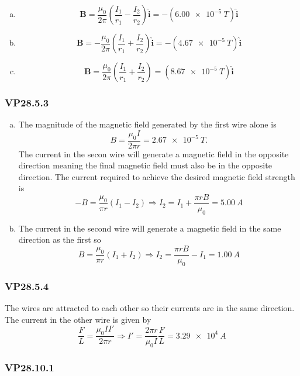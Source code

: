 \documentclass{article}
\begin{document}
\begin{enumerate}[(a)]
  \item \[\mathbf{B} = \frac{\mu_0}{2 \pi} \left( \frac{I_1}{r_1} - \frac{I_2}{r_2} \right) \hat{\mathbf{i}} = -(\qty{6.00e-5}{T}) \hat{\mathbf{i}}\]

  \item \[\mathbf{B} = -\frac{\mu_0}{2 \pi} \left( \frac{I_1}{r_1} + \frac{I_2}{r_2} \right) \hat{\mathbf{i}} = -(\qty{4.67e-5}{T}) \hat{\mathbf{i}}\]

  \item \[\mathbf{B} = \frac{\mu_0}{2 \pi} \left( \frac{I_1}{r_1} + \frac{I_2}{r_2} \right) = (\qty{8.67e-5}{T}) \hat{\mathbf{i}}\]
\end{enumerate}

\subsubsection{VP28.5.3}

\begin{enumerate}[(a)]
  \item The magnitude of the magnetic field generated by the first wire alone is \[B = \frac{\mu_0 I}{2 \pi r} = \qty{2.67e-5}{T}.\] The current in the secon wire will generate a magnetic field in the opposite direction meaning the final magnetic field must also be in the opposite direction. The current required to achieve the desired magnetic field strength is \[-B = \frac{\mu_0}{\pi r} (I_1 - I_2) \Rightarrow I_2 = I_1 + \frac{\pi r B}{\mu_0} = \qty{5.00}{A}\]

  \item The current in the second wire will generate a magnetic field in the same direction as the first so \[B = \frac{\mu_0}{\pi r} (I_1 + I_2) \Rightarrow I_2 = \frac{\pi r B}{\mu_0} - I_1 = \qty{1.00}{A}\]
\end{enumerate}

\subsubsection{VP28.5.4}

The wires are attracted to each other so their currents are in the same direction. The current in the other wire is given by \[\frac{F}{L} = \frac{\mu_0 I I'}{2 \pi r} \Rightarrow I' = \frac{2 \pi r}{\mu_0 I} \frac{F}{L} = \qty{3.29e4}{A}\]

\subsubsection{VP28.10.1}
\end{document}

